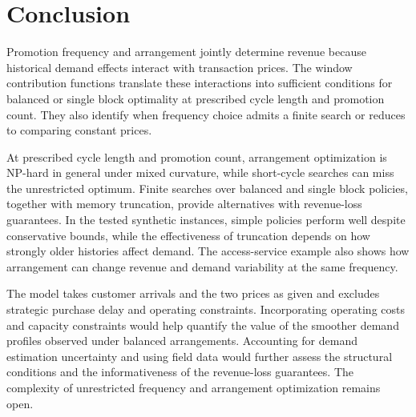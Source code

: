 \section{Conclusion}
\label{sec:conclusion}

\begingroup\color{blue}
Promotion frequency and arrangement jointly determine revenue because historical demand effects interact with transaction prices. The window contribution functions translate these interactions into sufficient conditions for balanced or single block optimality at prescribed cycle length and promotion count. They also identify when frequency choice admits a finite search or reduces to comparing constant prices.
\par\endgroup

\begingroup\color{blue}
At prescribed cycle length and promotion count, arrangement optimization is NP-hard in general under mixed curvature, while short-cycle searches can miss the unrestricted optimum. Finite searches over balanced and single block policies, together with memory truncation, provide alternatives with revenue-loss guarantees. In the tested synthetic instances, simple policies perform well despite conservative bounds, while the effectiveness of truncation depends on how strongly older histories affect demand. The access-service example also shows how arrangement can change revenue and demand variability at the same frequency.
\par\endgroup

\begingroup\color{blue}
The model takes customer arrivals and the two prices as given and excludes strategic purchase delay and operating constraints. Incorporating operating costs and capacity constraints would help quantify the value of the smoother demand profiles observed under balanced arrangements. Accounting for demand estimation uncertainty and using field data would further assess the structural conditions and the informativeness of the revenue-loss guarantees. The complexity of unrestricted frequency and arrangement optimization remains open.
\par\endgroup
